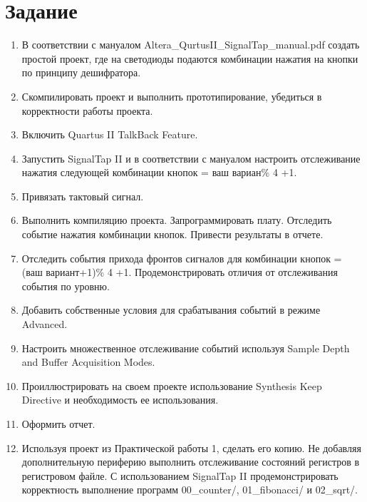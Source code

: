 \documentclass[a4paper,14pt]{article}
\begin{document}
	
	\tableofcontents
	\pagebreak
	\section{Задание}
	
	\begin{enumerate}
		\item В соответствии с мануалом Altera\_QurtusII\_SignalTap\_manual.pdf создать простой проект, где на светодиоды подаются комбинации нажатия на кнопки по принципу дешифратора.
		
		\item Скомпилировать проект и выполнить прототипирование, убедиться в корректности работы проекта.
		
		\item Включить Quartus II TalkBack Feature.
		
		\item Запустить SignalTap II и в соответствии с мануалом настроить отслеживание нажатия следующей комбинации кнопок = ваш вариан\% 4 +1.
		
		\item Привязать тактовый сигнал.
		
		\item Выполнить компиляцию проекта. Запрограммировать плату. Отследить событие нажатия комбинации кнопок. Привести результаты в отчете.
		
		\item Отследить события прихода фронтов сигналов для комбинации кнопок = (ваш вариант+1)\% 4 +1. Продемонстрировать отличия от отслеживания события по уровню.
		
		\item Добавить собственные условия для срабатывания событий в режиме Advanced.
			
		\item Настроить множественное отслеживание событий используя Sample Depth and Buffer Acquisition Modes.
		
		\item Проиллюстрировать на своем проекте использование Synthesis Keep Directive и необходимость ее использования.
		
		\item Оформить отчет.
		
		\item Используя проект из Практической работы 1, сделать его копию.
		Не добавляя дополнительную периферию выполнить отслеживание состояний регистров в регистровом файле.
		С использованием SignalTap II продемонстрировать корректность выполнение программ 00\_counter/, 01\_fibonacci/ и 02\_sqrt/.
		

\end{enumerate}
\end{document}
